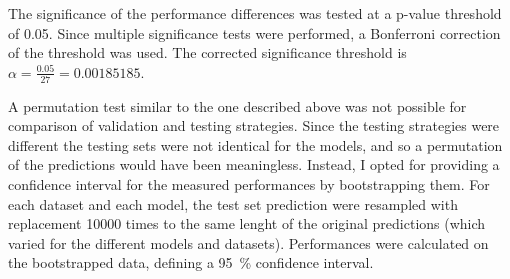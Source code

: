 The significance of the performance differences was tested at a p-value threshold of \num{0.05}.
Since multiple significance tests were performed, a Bonferroni correction of the threshold was used.
The corrected significance threshold is $\alpha = \frac{0.05}{27} = 0.00185185$.

A permutation test similar to the one described above was not possible for comparison of validation and testing strategies.
Since the testing strategies were different the testing sets were not identical for the models, and so a permutation of the predictions would have been meaningless.
Instead, I opted for providing a confidence interval for the measured performances by bootstrapping them.
For each dataset and each model, the test set prediction were resampled with replacement \num{10000} times to the same lenght of the original predictions (which varied for the different models and datasets).
Performances were calculated on the bootstrapped data, defining a \SI{95}{\percent} confidence interval.
